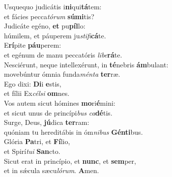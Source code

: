 \evenverse Usquequo judicátis i\textbf{ni}qui\textbf{tá}tem:~\*\\
\evenverse et fácies pecca\textit{tó}\textit{rum} \textbf{sú}\textbf{mi}tis?\\
\oddverse Judicáte egéno, \textbf{et} pu\textbf{píl}lo:~\*\\
\oddverse húmilem, et páuperem ju\textit{sti}\textit{fi}\textbf{cá}te.\\
\evenverse E\textbf{rí}pite \textbf{páu}perem:~\*\\
\evenverse et egénum de manu peccatóris \textit{li}\textit{be}\textbf{rá}te.\\
\oddverse Nesciérunt, neque intellexérunt, in \textbf{té}nebris \textbf{ám}bulant:~\*\\
\oddverse movebúntur ómnia funda\textit{mén}\textit{ta} \textbf{ter}ræ.\\
\evenverse Ego dixi: \textbf{Di}i \textbf{e}stis,~\*\\
\evenverse et fílii Ex\textit{cél}\textit{si} \textbf{om}nes.\\
\oddverse Vos autem sicut hómines \textbf{mo}ri\textbf{é}mini:~\*\\
\oddverse et sicut unus de princípi\textit{bus} \textit{ca}\textbf{dé}tis.\\
\evenverse Surge, Deus, \textbf{jú}dica \textbf{ter}ram:~\*\\
\evenverse quóniam tu hereditábis in óm\textit{ni}\textit{bus} \textbf{Gén}\textbf{ti}bus.\\
\oddverse Glória \textbf{Pa}tri, et \textbf{Fí}lio,~\*\\
\oddverse et Spirí\textit{tu}\textit{i} \textbf{San}cto.\\
\evenverse Sicut erat in princípio, et \textbf{nunc}, et \textbf{sem}per,~\*\\
\evenverse et in sǽcula sæcu\textit{ló}\textit{rum}. \textbf{A}men.\\
